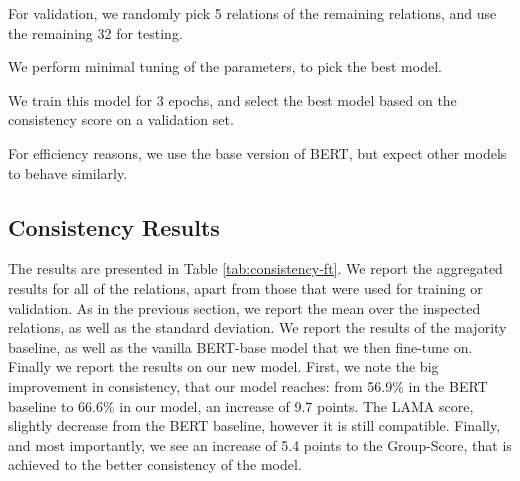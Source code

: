 For validation, we randomly pick 5 relations of the remaining relations, and use the remaining 32 for testing.

We perform minimal tuning of the parameters, to pick the best model.

We train this model for 3 epochs, and select the best model based on the consistency score on a validation set.

For efficiency reasons, we use the base version of BERT, but expect other models to behave similarly.


\subsection{Consistency Results}



The results are presented in Table \ref{tab:consistency-ft}. We report the aggregated results for all of the relations, apart from those that were used for training or validation. As in the previous section, we report the mean over the inspected relations, as well as the standard deviation.
We report the results of the majority baseline, as well as the vanilla BERT-base model that we then fine-tune on. Finally we report the results on our new model.
First, we note the big improvement in consistency, that our model reaches: from 56.9\% in the BERT baseline to 66.6\% in our model, an increase of 9.7 points. 
The LAMA score, slightly decrease from the BERT baseline, however it is still compatible. Finally, and most importantly, we see an increase of 5.4 points to the Group-Score, that is achieved to the better consistency of the model.




